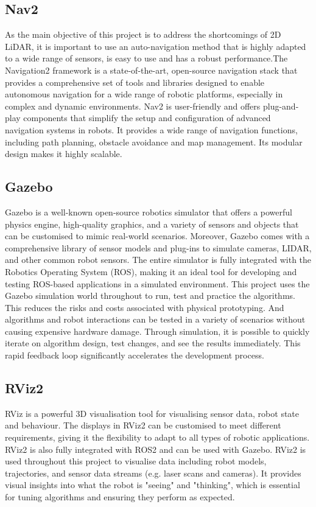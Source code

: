 \subsection{Nav2}
As the main objective of this project is to address the shortcomings of 2D LiDAR, it is important to use an auto-navigation method that is highly adapted to a wide range of sensors, is easy to use and has a robust performance.The Navigation2 framework is a state-of-the-art, open-source navigation stack that provides a comprehensive set of tools and libraries designed to enable autonomous navigation for a wide range of robotic platforms, especially in complex and dynamic environments. Nav2 is user-friendly and offers plug-and-play components that simplify the setup and configuration of advanced navigation systems in robots. It provides a wide range of navigation functions, including path planning, obstacle avoidance and map management. Its modular design makes it highly scalable.
\subsection{Gazebo}
Gazebo is a well-known open-source robotics simulator that offers a powerful physics engine, high-quality graphics, and a variety of sensors and objects that can be customised to mimic real-world scenarios. Moreover, Gazebo comes with a comprehensive library of sensor models and plug-ins to simulate cameras, LIDAR, and other common robot sensors. The entire simulator is fully integrated with the Robotics Operating System (ROS), making it an ideal tool for developing and testing ROS-based applications in a simulated environment. This project uses the Gazebo simulation world throughout to run, test and practice the algorithms. This reduces the risks and costs associated with physical prototyping. And algorithms and robot interactions can be tested in a variety of scenarios without causing expensive hardware damage. Through simulation, it is possible to quickly iterate on algorithm design, test changes, and see the results immediately. This rapid feedback loop significantly accelerates the development process.
\subsection{RViz2}
RViz is a powerful 3D visualisation tool for visualising sensor data, robot state and behaviour. The displays in RViz2 can be customised to meet different requirements, giving it the flexibility to adapt to all types of robotic applications. RViz2 is also fully integrated with ROS2 and can be used with Gazebo. RViz2 is used throughout this project to visualise data including robot models, trajectories, and sensor data streams (e.g. laser scans and cameras). It provides visual insights into what the robot is "seeing" and "thinking", which is essential for tuning algorithms and ensuring they perform as expected.
